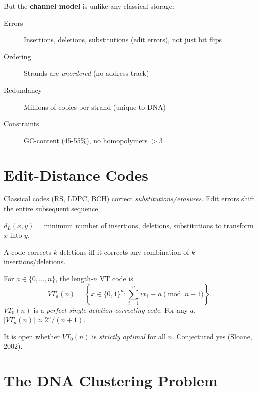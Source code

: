 But the \textbf{channel model} is unlike any classical storage:
\begin{description}
    \item[Errors] Insertions, deletions, substitutions (edit errors), not just bit flips
    \item[Ordering] Strands are \emph{unordered} (no address track)
    \item[Redundancy] Millions of copies per strand (unique to DNA)
    \item[Constraints] GC-content (45-55\%), no homopolymers $>3$
\end{description}

\section{Edit-Distance Codes}
\label{sec:dna:edit}

Classical codes (RS, LDPC, BCH) correct \emph{substitutions/erasures}. Edit errors shift the entire subsequent sequence.

\begin{definition}
$d_L(x,y)$ = minimum number of insertions, deletions, substitutions to transform $x$ into $y$.
\end{definition}

\begin{theorem}[Levenshtein 1965]
A code corrects $k$ deletions iff it corrects any combination of $k$ insertions/deletions.
\end{theorem}

\begin{example}
For $a \in \{0,\dots,n\}$, the length-$n$ VT code is
\[
VT_a(n) = \left\{ x \in \{0,1\}^n : \sum_{i=1}^n i x_i \equiv a \pmod{n+1} \right\}.
\]
$VT_0(n)$ is a \emph{perfect single-deletion-correcting code}. For any $a$, $|VT_a(n)| \approx 2^n/(n+1)$.
\end{example}

\begin{theorem}
It is open whether $VT_0(n)$ is \emph{strictly optimal} for all $n$. Conjectured yes (Sloane, 2002).
\end{theorem}

\section{The DNA Clustering Problem}
\label{sec:dna:clustering}

